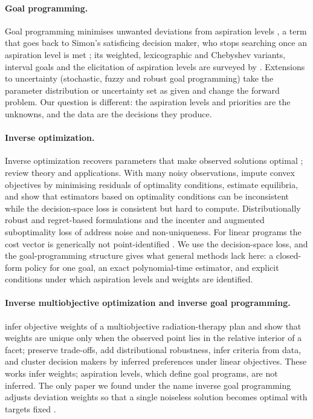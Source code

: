 \documentclass[pdflatex,sn-basic]{sn-jnl}
\theoremstyle{thmstyleone}\newtheorem{proposition}{Proposition}\newtheorem{theorem}{Theorem}
\theoremstyle{thmstylethree}\newtheorem{remark}{Remark}
\begin{document}
\paragraph{Goal programming.} Goal programming minimises unwanted deviations from aspiration levels \citep{charnes1961,charnes1977}, a term that goes back to Simon's satisficing decision maker, who stops searching once an aspiration level is met \citep{simon1955}; its weighted, lexicographic and Chebyshev variants, interval goals and the elicitation of aspiration levels are surveyed by \citet{tamiz1998}. Extensions to uncertainty (stochastic, fuzzy and robust goal programming) take the parameter distribution or uncertainty set as given and change the forward problem. Our question is different: the aspiration levels and priorities are the unknowns, and the data are the decisions they produce.

\paragraph{Inverse optimization.} Inverse optimization recovers parameters that make observed solutions optimal \citep{ahuja2001}; \citet{chan2025review} review theory and applications. With many noisy observations, \citet{keshavarz2011} impute convex objectives by minimising residuals of optimality conditions, \citet{bertsimas2015} estimate equilibria, and \citet{aswani2018} show that estimators based on optimality conditions can be inconsistent while the decision-space loss is consistent but hard to compute. Distributionally robust and regret-based formulations \citep{esfahani2018,besbes2025} and the incenter and augmented suboptimality loss of \citet{zattoni2025} address noise and non-uniqueness. For linear programs the cost vector is generically not point-identified \citep{ahmadi2026}. We use the decision-space loss, and the goal-programming structure gives what general methods lack here: a closed-form policy for one goal, an exact polynomial-time estimator, and explicit conditions under which aspiration levels and weights are identified.

\paragraph{Inverse multiobjective optimization and inverse goal programming.} \citet{chan2014} infer objective weights of a multiobjective radiation-therapy plan and show that weights are unique only when the observed point lies in the relative interior of a facet; \citet{chanlee2018} preserve trade-offs, \citet{dongzeng2021} add distributional robustness, \citet{gebken2021} infer criteria from data, and \citet{carrizosa2026} cluster decision makers by inferred preferences under linear objectives. These works infer weights; aspiration levels, which define goal programs, are not inferred. The only paper we found under the name inverse goal programming adjusts deviation weights so that a single noiseless solution becomes optimal with targets fixed \citep{saif2023}.
\end{document}
